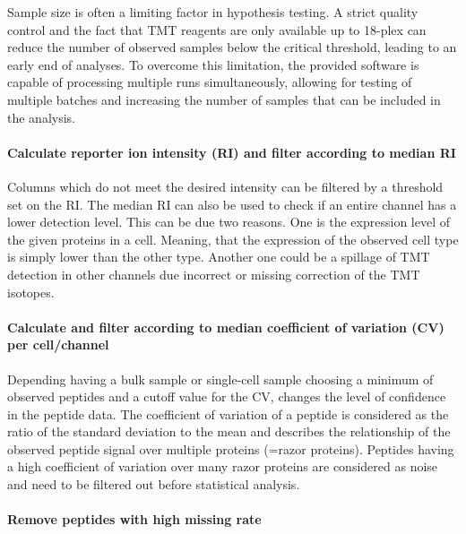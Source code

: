 \documentclass[
  11pt,
]{article}
\begin{document}
Sample size is often a limiting factor in hypothesis testing. A strict
quality control and the fact that TMT reagents are only available up to
18-plex can reduce the number of observed samples below the critical
threshold, leading to an early end of analyses. To overcome this
limitation, the provided software is capable of processing multiple runs
simultaneously, allowing for testing of multiple batches and increasing
the number of samples that can be included in the analysis.

\hypertarget{calculate-reporter-ion-intensity-ri-and-filter-according-to-median-ri}{%
\paragraph{Calculate reporter ion intensity (RI) and filter according to
median
RI}\label{calculate-reporter-ion-intensity-ri-and-filter-according-to-median-ri}}

Columns which do not meet the desired intensity can be filtered by a
threshold set on the RI. The median RI can also be used to check if an
entire channel has a lower detection level. This can be due two reasons.
One is the expression level of the given proteins in a cell. Meaning,
that the expression of the observed cell type is simply lower than the
other type. Another one could be a spillage of TMT detection in other
channels due incorrect or missing correction of the TMT isotopes.

\hypertarget{calculate-and-filter-according-to-median-coefficient-of-variation-cv-per-cellchannel}{%
\paragraph{Calculate and filter according to median coefficient of
variation (CV) per
cell/channel}\label{calculate-and-filter-according-to-median-coefficient-of-variation-cv-per-cellchannel}}

Depending having a bulk sample or single-cell sample choosing a minimum
of observed peptides and a cutoff value for the CV, changes the level of
confidence in the peptide data. The coefficient of variation of a
peptide is considered as the ratio of the standard deviation to the mean
and describes the relationship of the observed peptide signal over
multiple proteins (=razor proteins). Peptides having a high coefficient
of variation over many razor proteins are considered as noise and need
to be filtered out before statistical analysis.

\hypertarget{remove-peptides-with-high-missing-rate}{%
\paragraph{Remove peptides with high missing
rate}\label{remove-peptides-with-high-missing-rate}}
\end{document}
